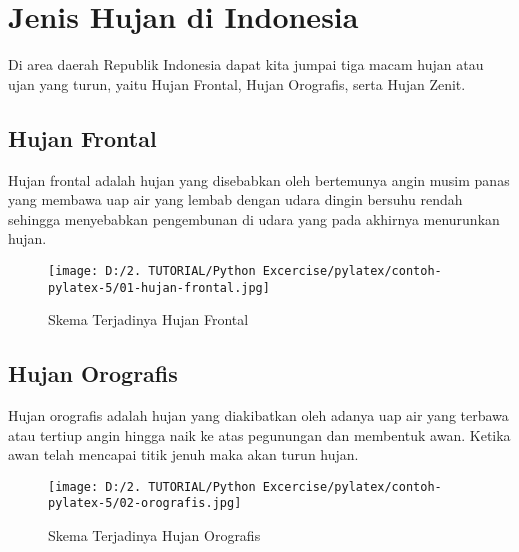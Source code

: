 \documentclass[a4paper]{article}%
\begin{document}
%
\normalsize%
\section{Jenis Hujan di Indonesia}%
\label{sec:JenisHujandiIndonesia}%
Di area daerah Republik Indonesia dapat kita jumpai tiga macam hujan atau ujan yang turun, yaitu Hujan Frontal, Hujan Orografis, serta Hujan Zenit.%
\subsection{Hujan Frontal}%
\label{subsec:HujanFrontal}%
Hujan frontal adalah hujan yang disebabkan oleh bertemunya angin musim panas yang membawa uap air yang lembab dengan udara dingin bersuhu rendah sehingga menyebabkan pengembunan di udara yang pada akhirnya menurunkan hujan.%


\begin{figure}[h!]%
\centering%
\texttt{[image: D:/2. TUTORIAL/Python Excercise/pylatex/contoh-pylatex-5/01-hujan-frontal.jpg]}%
\caption{Skema Terjadinya Hujan Frontal}%
\end{figure}

%
\subsection{Hujan Orografis}%
\label{subsec:HujanOrografis}%
Hujan orografis adalah hujan yang diakibatkan oleh adanya uap air yang terbawa atau tertiup angin hingga naik ke atas pegunungan dan membentuk awan. Ketika awan telah mencapai titik jenuh maka akan turun hujan.%


\begin{figure}[h!]%
\centering%
\texttt{[image: D:/2. TUTORIAL/Python Excercise/pylatex/contoh-pylatex-5/02-orografis.jpg]}%
\caption{Skema Terjadinya Hujan Orografis}%
\end{figure}

%
\end{document}
